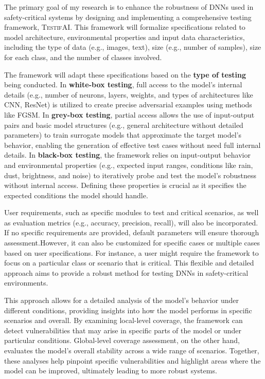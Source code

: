 The primary goal of my research is to enhance the robustness of DNNs used in safety-critical systems by designing and implementing a comprehensive testing framework, \textsc{TestifAI}. This framework will formalize specifications related to model architecture, environmental properties and input data characteristics, including the type of data (e.g., images, text), size (e.g., number of samples), size for each class, and the number of classes involved.

 The framework will adapt these specifications based on the \textbf{type of testing} being conducted. In \textbf{white-box testing}, full access to the model's internal details (e.g., number of neurons, layers, weights, and types of architectures like CNN, ResNet) is utilized to create precise adversarial examples using methods like FGSM. In \textbf{grey-box testing}, partial access allows the use of input-output pairs and basic model structures (e.g., general architecture without detailed parameters) to train surrogate models that approximate the target model's behavior, enabling the generation of effective test cases without need full internal details. In \textbf{black-box testing}, the framework relies on input-output behavior and environmental properties (e.g., expected input ranges, conditions like rain, dust, brightness, and noise) to iteratively probe and test the model's robustness without internal access. Defining these properties is crucial as it specifies the expected conditions the model should handle.

User requirements, such as specific modules to test and critical scenarios, as well as evaluation metrics (e.g., accuracy, precision, recall), will also be incorporated. If no specific requirements are provided, default parameters will ensure thorough assessment.However, it can also be customized for specific cases or multiple cases based on user specifications. For instance, a user might require the framework to focus on a particular class or scenario that is critical. This flexible and detailed approach aims to provide a robust method for testing DNNs in safety-critical environments.


 This approach allows for a detailed analysis of the model's behavior under different conditions, providing insights into how the model performs in specific scenarios and overall. By examining local-level coverage, the framework can detect vulnerabilities that may arise in specific parts of the model or under particular conditions. Global-level coverage assessment, on the other hand, evaluates the model's overall stability across a wide range of scenarios. Together, these analyses help pinpoint specific vulnerabilities and highlight areas where the model can be improved, ultimately leading to more robust systems.

